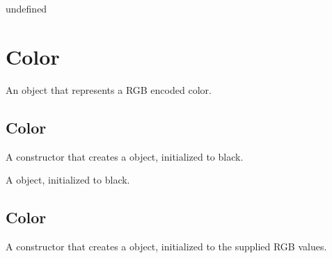 \documentclass[letterpaper,12pt,english,openany,oneside]{sphinxmanual}
\begin{document}
\begin{sphinxVerbatim}[commandchars=\\\{\}]
\end{sphinxVerbatim}
\label{\detokenize{JS_3D_API:returns-10}}

undefined


\section{Color}
\label{\detokenize{JS_3D_API:color}}
An object that represents a RGB encoded color.

\label{\detokenize{JS_3D_API:properties-6}}


\subsection{Color}
\label{\detokenize{JS_3D_API:color-1}}\label{\detokenize{JS_3D_API:id2}}
A constructor that creates a  object, initialized to black.

\label{\detokenize{JS_3D_API:syntax-11}}

\begin{sphinxVerbatim}[commandchars=\\\{\}]
 
\end{sphinxVerbatim}
\label{\detokenize{JS_3D_API:returns-11}}

A  object, initialized to black.


\subsection{Color}
\label{\detokenize{JS_3D_API:color-2}}\label{\detokenize{JS_3D_API:id3}}
A constructor that creates a  object, initialized to the supplied RGB values.

\label{\detokenize{JS_3D_API:syntax-12}}

\begin{sphinxVerbatim}[commandchars=\\\{\}]
   
\end{sphinxVerbatim}
\label{\detokenize{JS_3D_API:parameters-6}}
\end{document}
